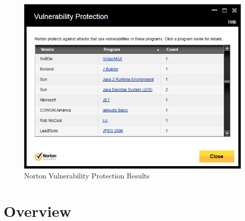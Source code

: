 \begin{figure} \begin{framed} \centering \includegraphics[width=0.9\linewidth]{norton-cve}
\end{framed}
	\label{fig:nort} \caption{Norton Vulnerability Protection Results}
\end{figure}

\section{Overview}
